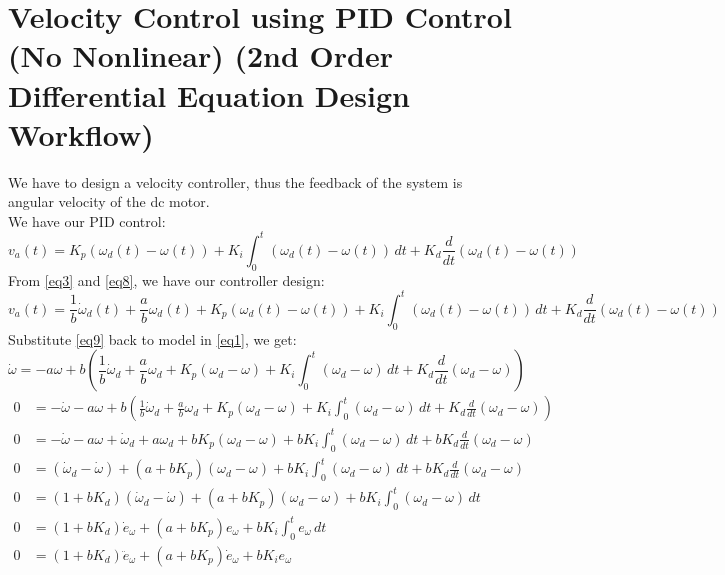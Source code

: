 \documentclass[12pt,a4paper]{article}
\begin{document}
	\section{Velocity Control using PID Control (No Nonlinear) (2nd Order Differential Equation Design Workflow)}
	We have to design a velocity controller, thus the feedback of the system is angular velocity of the dc motor.\\
	We have our PID control:
	\begin{equation}
		\label{eq8}
		v_a(t) = K_p(\omega_d(t) - \omega(t)) + K_i \int_{0}^{t} (\omega_d(t) - \omega(t)) \,dt + K_d \frac{d}{dt} (\omega_d(t) - \omega(t))
	\end{equation}
	From \autoref{eq3} and \autoref{eq8}, we have our controller design:
	\begin{equation}
		\label{eq9}
		v_a(t) = \frac{1}{b}\dot{\omega}_d(t) + \frac{a}{b}\omega_d(t) + K_p(\omega_d(t) - \omega(t)) + K_i \int_{0}^{t} (\omega_d(t) - \omega(t)) \,dt + K_d \frac{d}{dt} (\omega_d(t) - \omega(t))
	\end{equation}
	Substitute \autoref{eq9} back to model in \autoref{eq1}, we get:
	\begin{equation}
		\label{eq10}
		\dot{\omega} = -a\omega + b\left(\frac{1}{b}\dot{\omega}_d + \frac{a}{b}\omega_d + K_p(\omega_d - \omega) + K_i \int_{0}^{t} (\omega_d - \omega) \,dt + K_d \frac{d}{dt} (\omega_d - \omega) \right)
	\end{equation}
	\[
	\begin{split}
		0 &= -\dot{\omega} -a\omega + b(\frac{1}{b}\dot{\omega}_d + \frac{a}{b}\omega_d + K_p(\omega_d - \omega) + K_i \int_{0}^{t} (\omega_d - \omega) \,dt + K_d \frac{d}{dt} (\omega_d - \omega)) \\
		0 &= -\dot{\omega} -a\omega + \dot{\omega}_d + a\omega_d + bK_p(\omega_d - \omega) + bK_i \int_{0}^{t} (\omega_d - \omega) \,dt + bK_d \frac{d}{dt} (\omega_d - \omega) \\
		0 &= (\dot{\omega}_d -\dot{\omega}) + (a+bK_p)(\omega_d -\omega) + bK_i \int_{0}^{t} (\omega_d - \omega) \,dt + bK_d \frac{d}{dt} (\omega_d - \omega) \\
		0 &= (1+bK_d)(\dot{\omega}_d -\dot{\omega}) + (a+bK_p)(\omega_d -\omega) + bK_i \int_{0}^{t} (\omega_d - \omega) \,dt \\
		0 &= (1+bK_d)\dot{e}_{\omega} + (a+bK_p)e_{\omega} + bK_i \int_{0}^{t} e_{\omega} \,dt \\
		0 &= (1+bK_d)\ddot{e}_{\omega} + (a+bK_p)\dot{e}_{\omega} + bK_i e_{\omega} \\
	\end{split}
	\]
\end{document}
